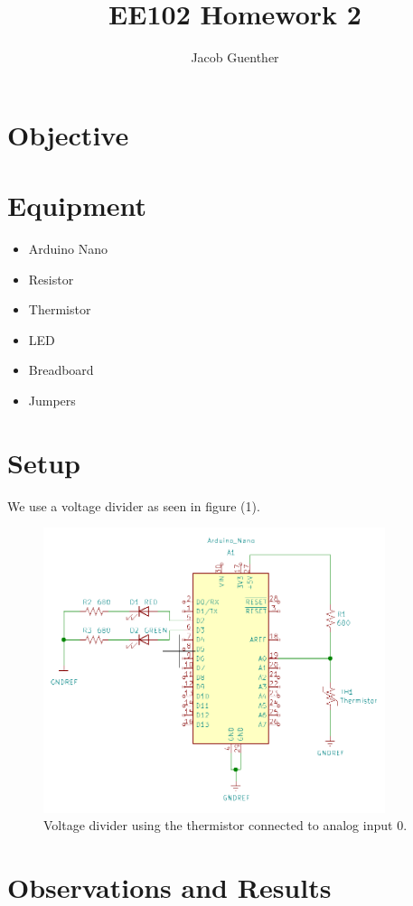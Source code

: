 \documentclass{article}
\title{EE102 Homework 2}
\author{Jacob Guenther}
\begin{document}


\section{Objective}

\section{Equipment}
\begin{itemize}
	\item Arduino Nano
	\item Resistor
	\item Thermistor
	\item LED
	\item Breadboard
	\item Jumpers
\end{itemize}

\section{Setup}
We use a voltage divider as seen in figure (1).

\begin{figure}[H]
	\begin{center}
	\includegraphics[width=10cm]{schematic}
	\end{center}
	\caption{Voltage divider using the thermistor connected to analog input 0.}
\end{figure}

\section{Observations and Results}
\end{document}
